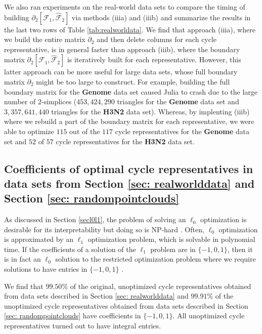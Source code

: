 \documentclass[11pt,onecolumn]{article}
\newcommand{\tab}{Table }
\newcommand{\se}{Section }
\theoremstyle{plain}
\theoremstyle{definition}
\begin{document}
We also ran experiments on the real-world data sets to compare the timing of building $\partial_{2}[ \mathcal{F}_1 , \hat {\mathcal{F}}_{2}]$ via methods (iiia) and (iiib) and summarize the results in the last two rows of \tab \ref{tab:realworldata}. We find that approach (iiia), where we build the entire matrix $\partial_2$ and then delete columns for each cycle representative, is in general faster than approach (iiib), where the boundary matrix $\partial_2[\mathcal{F}_1, \hat{\mathcal{F}}_2]$ is iteratively built for each representative. However, this latter approach can be more useful for large data sets, whose full boundary matrix $\partial_2$ might be too large to construct. For example, building the full boundary matrix for the \textbf{Genome} data set caused Julia to crash due to the large number  of $2$-simplices ($453{,}424{,}290$ triangles for the \textbf{Genome} data set and $3{,}357{,}641{,}440$ triangles for the \textbf{H3N2} data set). Whereas, by implenting (iiib) where we rebuild a part of the boundary matrix for each representative, we were able to optimize $115$ out of the $117$ cycle representatives for the \textbf{Genome} data set and $52$ of $57$ cycle representatives for the \textbf{H3N2} data set.

\subsection{Coefficients of optimal cycle representatives in data sets from \se \ref{sec: realworlddata} and \se \ref{sec: randompointclouds}}
\label{coefficient}
As discussed in \se \ref{secl0l1}, the problem of solving an $\ell_0$ optimization is desirable for its interpretability but doing so is NP-hard \cite{NPhardL0}. Often, $\ell_0$ optimization is approximated by an $\ell_1$ optimization problem, which is solvable in polynomial time. If the coefficients of a solution of the $\ell_1$ problem are in $\{-1,0,1\}$, then it is in fact an $\ell_0$ solution to the restricted optimization problem where we require solutions to have entries in $\{-1, 0, 1\}$ \cite{Escolar2016, Obayashi2018}. 

We find that $99.50\%$ of the original, unoptimized cycle representatives obtained from data sets described in \se \ref{sec: realworlddata} and $99.91\%$ of the unoptimized cycle representatives obtained from data sets described in \se \ref{sec: randompointclouds} have coefficients in $\{-1,0,1\}$. All unoptimized cycle representatives turned out to have integral entries.
\end{document}
